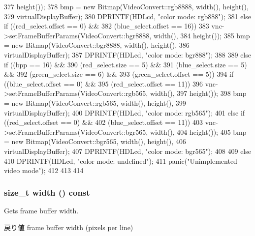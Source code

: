 \begin{DoxyCode}
{{{{377                         height());
378                 bmp = new Bitmap(VideoConvert::rgb8888, width(), height(),
379                         virtualDisplayBuffer);
380                 DPRINTF(HDLcd, "color mode:  rgb888\n");
381             } else if ((red_select.offset == 0) &&
382                     (blue_select.offset == 16)) {
383                 vnc->setFrameBufferParams(VideoConvert::bgr8888, width(),
384                         height());
385                 bmp = new Bitmap(VideoConvert::bgr8888, width(), height(),
386                         virtualDisplayBuffer);
387                 DPRINTF(HDLcd, "color mode:  bgr888\n");
388             }
389         } else if ((bpp == 16) &&
390                 (red_select.size == 5) &&
391                 (blue_select.size == 5) &&
392                 (green_select.size == 6) &&
393                 (green_select.offset == 5)) {
394             if ((blue_select.offset == 0) &&
395                     (red_select.offset == 11)) {
396                 vnc->setFrameBufferParams(VideoConvert::rgb565, width(),
397                         height());
398                 bmp = new Bitmap(VideoConvert::rgb565, width(), height(),
399                         virtualDisplayBuffer);
400                 DPRINTF(HDLcd, "color mode:  rgb565\n");
401             } else if ((red_select.offset == 0) &&
402                     (blue_select.offset == 11)) {
403                 vnc->setFrameBufferParams(VideoConvert::bgr565, width(),
404                         height());
405                 bmp = new Bitmap(VideoConvert::bgr565, width(), height(),
406                         virtualDisplayBuffer);
407                 DPRINTF(HDLcd, "color mode:  bgr565\n");
408             }
409         } else {
410             DPRINTF(HDLcd, "color mode:  undefined\n");
411             panic("Unimplemented video mode\n");
412         }
413     }
414 }
\end{DoxyCode}
\hypertarget{classHDLcd_a20646dd69e82674924c6e5eb1458eefa}{
\subsubsection[{width}]{\setlength{\rightskip}{0pt plus 5cm}size\_\-t width () const}}
\label{classHDLcd_a20646dd69e82674924c6e5eb1458eefa}
Gets frame buffer width.

\begin{DoxyReturn}{戻り値}
frame buffer width (pixels per line) 
\end{DoxyReturn}



